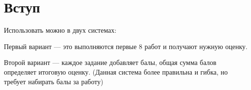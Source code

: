 \chapter*{Вступ}							%

Использовать можно в двух системах:

Первый вариант --- это выполняются первые 8 работ и получают нужную оценку.

Второй вариант --- каждое задание добавляет балы, общая сумма балов
определяет итоговую оценку. (Данная система более правильна и гибка, но
требует набирать балы за работу)
